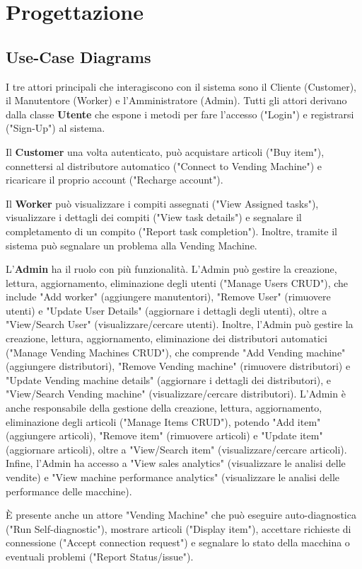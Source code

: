 \section{Progettazione}
\subsection{Use-Case Diagrams}
I tre attori principali che interagiscono con il sistema sono il Cliente (Customer), il Manutentore (Worker) e l'Amministratore (Admin).
Tutti gli attori derivano dalla classe \textbf{Utente} che espone i metodi per fare l'accesso ("Login") e registrarsi ("Sign-Up") al sistema.

Il \textbf{Customer} una volta autenticato, può acquistare articoli ("Buy item"), connettersi al distributore automatico ("Connect to Vending Machine") e ricaricare il proprio account ("Recharge account").

Il \textbf{Worker} può visualizzare i compiti assegnati ("View Assigned tasks"), visualizzare i dettagli dei compiti ("View task details") e segnalare il completamento di un compito ("Report task completion"). Inoltre, tramite il sistema può segnalare un problema alla Vending Machine.

L'\textbf{Admin} ha il ruolo con più funzionalità. L'Admin può gestire la creazione, lettura, aggiornamento, eliminazione degli utenti ("Manage Users CRUD"), che include "Add worker" (aggiungere manutentori), "Remove User" (rimuovere utenti) e "Update User Details" (aggiornare i dettagli degli utenti), oltre a "View/Search User" (visualizzare/cercare utenti).
Inoltre, l'Admin può gestire la creazione, lettura, aggiornamento, eliminazione dei distributori automatici ("Manage Vending Machines CRUD"), che comprende "Add Vending machine" (aggiungere distributori), "Remove Vending machine" (rimuovere distributori) e "Update Vending machine details" (aggiornare i dettagli dei distributori), e "View/Search Vending machine" (visualizzare/cercare distributori).
L'Admin è anche responsabile della gestione della creazione, lettura, aggiornamento, eliminazione degli articoli ("Manage Items CRUD"), potendo "Add item" (aggiungere articoli), "Remove item" (rimuovere articoli) e "Update item" (aggiornare articoli), oltre a "View/Search item" (visualizzare/cercare articoli). Infine, l'Admin ha accesso a "View sales analytics" (visualizzare le analisi delle vendite) e "View machine performance analytics" (visualizzare le analisi delle performance delle macchine).

È presente anche un attore "Vending Machine" che può eseguire auto-diagnostica ("Run Self-diagnostic"), mostrare articoli ("Display item"), accettare richieste di connessione ("Accept connection request") e segnalare lo stato della macchina o eventuali problemi ("Report Status/issue").


